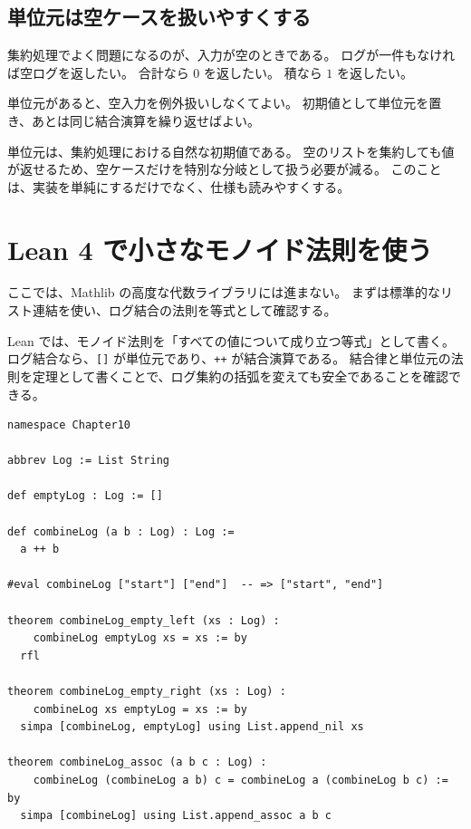 \subsection{単位元は空ケースを扱いやすくする}

集約処理でよく問題になるのが、入力が空のときである。
ログが一件もなければ空ログを返したい。
合計なら \(0\) を返したい。
積なら \(1\) を返したい。

単位元があると、空入力を例外扱いしなくてよい。
初期値として単位元を置き、あとは同じ結合演算を繰り返せばよい。

\begin{softwarebox}
単位元は、集約処理における自然な初期値である。
空のリストを集約しても値が返せるため、空ケースだけを特別な分岐として扱う必要が減る。
このことは、実装を単純にするだけでなく、仕様も読みやすくする。
\end{softwarebox}

\section{Lean 4 で小さなモノイド法則を使う}

ここでは、Mathlib の高度な代数ライブラリには進まない。
まずは標準的なリスト連結を使い、ログ結合の法則を等式として確認する。

\begin{leanbox}
Lean では、モノイド法則を「すべての値について成り立つ等式」として書く。
ログ結合なら、\texttt{[]} が単位元であり、\texttt{++} が結合演算である。
結合律と単位元の法則を定理として書くことで、ログ集約の括弧を変えても安全であることを確認できる。
\end{leanbox}

\begin{listing}[htbp]
\begin{verbatim}
namespace Chapter10

abbrev Log := List String

def emptyLog : Log := []

def combineLog (a b : Log) : Log :=
  a ++ b

#eval combineLog ["start"] ["end"]  -- => ["start", "end"]

theorem combineLog_empty_left (xs : Log) :
    combineLog emptyLog xs = xs := by
  rfl

theorem combineLog_empty_right (xs : Log) :
    combineLog xs emptyLog = xs := by
  simpa [combineLog, emptyLog] using List.append_nil xs

theorem combineLog_assoc (a b c : Log) :
    combineLog (combineLog a b) c = combineLog a (combineLog b c) := by
  simpa [combineLog] using List.append_assoc a b c
\end{verbatim}
\caption{ログ結合の単位元と結合律}
\label{lst:ch10_log_laws}
\end{listing}

